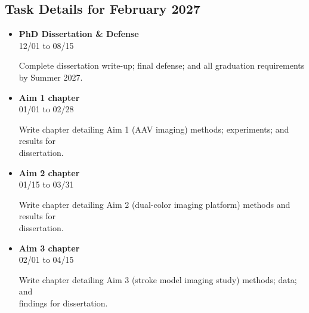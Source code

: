 \documentclass[landscape,a4paper]{article}
\begin{document}
\subsection{Task Details for February 2027}
\begin{itemize}[leftmargin=1cm, itemsep=0.8em]
    \item \textcolor{other}{\textbf{PhD Dissertation \& Defense}}\\[0.2em]
          \textcolor{black!70}{\small 12/01 to 08/15}
\\[0.3em]
          \begin{minipage}[t]{0.85\textwidth}
          \textcolor{black!80}{Complete dissertation write-up; final defense; and all graduation requirements by Summer 2027.}
          \end{minipage}

    \item \textcolor{other}{\textbf{Aim 1 chapter}}\\[0.2em]
          \textcolor{black!70}{\small 01/01 to 02/28}
\\[0.3em]
          \begin{minipage}[t]{0.85\textwidth}
          \textcolor{black!80}{Write chapter detailing Aim 1 (AAV imaging) methods; experiments; and results for\\[0.1em]
          dissertation.}
          \end{minipage}

    \item \textcolor{other}{\textbf{Aim 2 chapter}}\\[0.2em]
          \textcolor{black!70}{\small 01/15 to 03/31}
\\[0.3em]
          \begin{minipage}[t]{0.85\textwidth}
          \textcolor{black!80}{Write chapter detailing Aim 2 (dual-color imaging platform) methods and results for\\[0.1em]
          dissertation.}
          \end{minipage}

    \item \textcolor{other}{\textbf{Aim 3 chapter}}\\[0.2em]
          \textcolor{black!70}{\small 02/01 to 04/15}
\\[0.3em]
          \begin{minipage}[t]{0.85\textwidth}
          \textcolor{black!80}{Write chapter detailing Aim 3 (stroke model imaging study) methods; data; and\\[0.1em]
          findings for dissertation.}
          \end{minipage}

\end{itemize}
\end{document}
